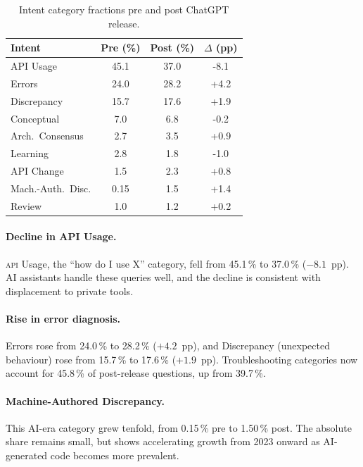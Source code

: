 \documentclass[sigconf]{acmart}
\begin{document}
\begin{table}[t]
  \caption{Intent category fractions
    pre and post ChatGPT release.}
  \label{tab:intent-prepost}
  \centering
  \small
  \begin{tabular}{l
      S[table-format=2.1]
      S[table-format=2.1]
      S[table-format=+1.1,
        explicit-sign]}
    \toprule
    Intent
      & {Pre (\%)} & {Post (\%)}
      & {$\Delta$ (pp)} \\
    \midrule
    API Usage        & 45.1 & 37.0 & -8.1 \\
    Errors           & 24.0 & 28.2 & +4.2 \\
    Discrepancy      & 15.7 & 17.6 & +1.9 \\
    Conceptual       &  7.0 &  6.8 & -0.2 \\
    Arch.\ Consensus &  2.7 &  3.5 & +0.9 \\
    Learning         &  2.8 &  1.8 & -1.0 \\
    API Change       &  1.5 &  2.3 & +0.8 \\
    {Mach.-Auth.\ Disc.}
                     & 0.15 &  1.5 & +1.4 \\
    Review           &  1.0 &  1.2 & +0.2 \\
    \bottomrule
  \end{tabular}
\end{table}

\paragraph{Decline in API Usage.}
\textsc{api} Usage,
the \enquote{how do I use X} category,
fell from 45.1\,\% to 37.0\,\% ($-8.1$~pp).
AI assistants handle these queries well,
and the decline is consistent
with displacement to private tools.

\paragraph{Rise in error diagnosis.}
Errors rose from 24.0\,\% to 28.2\,\% ($+4.2$~pp),
and Discrepancy (unexpected behaviour)
rose from 15.7\,\% to 17.6\,\% ($+1.9$~pp).
Troubleshooting categories now account
for 45.8\,\% of post-release questions,
up from 39.7\,\%.

\paragraph{Machine-Authored Discrepancy.}
This AI-era category grew tenfold,
from 0.15\,\% pre to 1.50\,\% post.
The absolute share remains small,
but  shows
accelerating growth from 2023 onward
as AI-generated code
becomes more prevalent.
\end{document}
